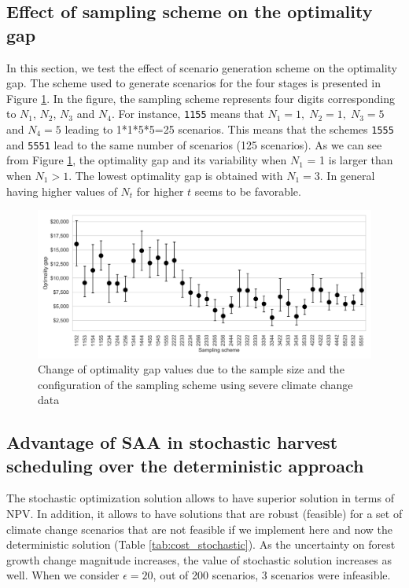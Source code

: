\documentclass[forests,article,submit,moreauthors,pdftex]{Definitions/mdpi}
\begin{document}
\subsection{Effect of sampling scheme on the optimality gap}\label{sec:sampl_scheme}

In this section, we test the effect of scenario generation scheme on the optimality gap. The scheme used to generate scenarios for the four stages is presented in Figure \ref{fig:gap_plot}. In the figure, the sampling scheme represents four digits corresponding to $N_1$, $N_2$, $N_3$ and $N_4$. For instance, \texttt{1155} means that $N_1=1, \; N_2=1, \; N_3=5$ and $N_4=5$ leading to 1*1*5*5=25 scenarios. This means that the schemes \texttt{1555} and \texttt{5551} lead to the same number of scenarios (125 scenarios). As we can see from Figure \ref{fig:gap_plot}, the optimality gap and its variability when $N_1$ = 1 is larger than when $N_1 > 1$. The lowest optimality gap is obtained with $N_1 = 3$. In general having higher values of $N_t$ for higher $t$ seems to be favorable. 

\begin{figure}[!htb!]
    \centering
    \includegraphics[width=1\linewidth]{cust_gaps_all.png}
    \caption{Change of optimality gap values due to the sample size and the configuration of the sampling scheme using severe climate change data}
    \label{fig:gap_plot}
\end{figure}

\subsection{Advantage of SAA in stochastic harvest scheduling over the deterministic approach}

The stochastic optimization solution allows to have superior solution in terms of NPV. In addition, it allows to have solutions that are robust (feasible) for a set of climate change scenarios that are not feasible if we implement here and now the deterministic solution (Table \ref{tab:cost_stochastic}). As the uncertainty on forest growth change magnitude increases, the value of stochastic solution increases as well. When we consider  $\epsilon=20$, out of 200 scenarios, 3 scenarios were infeasible.
\end{document}
